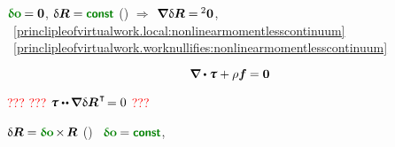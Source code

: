 \vspace{-0.1em}  ${\constvarvector{o} \hspace{-0.1ex} = \bm{0}}$, ${\variation{\bm{R}} = \boldconst}$ () ${\Rightarrow}$~${\hspace{-0.2ex}\boldnabla \hspace{.1ex} \variation{\bm{R}} = \hspace{-0.12ex} {^2\bm{0}}}$,
~\eqref{princlipleofvirtualwork.local:nonlinearmomentlesscontinuum}
~\eqref{princlipleofvirtualwork.worknullifies:nonlinearmomentlesscontinuum}

\nopagebreak\vspace{-0.2em}\begin{equation*}
\boldnabla \dotp \cauchystress + \rho \bm{f} \hspace{-0.1ex} = \bm{0}
\end{equation*}

\vspace{-0.5em} \noindent \textcolor{red}{???}  \textcolor{red}{???} ${\cauchystress \dotdotp \hspace{-0.12ex} \boldnabla \hspace{.1ex} \variation{\bm{R}}^{\hspace{.16ex}\T} \hspace{-0.32ex} = 0}$ \textcolor{red}{???}

 ${\variation{\bm{R}} = \constvarvector{o} \hspace{-0.2ex} \times \hspace{-0.2ex} \bm{R}}$ () ~${\constvarvector{o} \hspace{-0.1ex} = \boldconst}$, 

